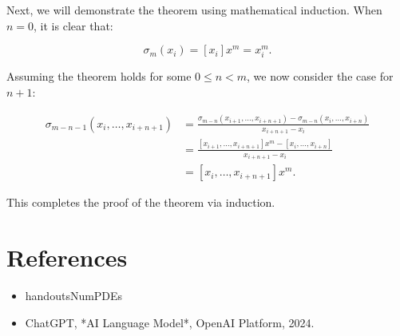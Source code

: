 \documentclass[a4paper]{article}
\begin{document}
Next, we will demonstrate the theorem using mathematical induction. When \( n = 0 \), it is clear that:

\[
\sigma_m(x_i) = [x_i] x^m = x_i^m.
\]

Assuming the theorem holds for some \( 0 \leq n < m \), we now consider the case for \( n + 1 \):

\begin{align*}
    \sigma_{m-n-1}(x_i, \ldots, x_{i+n+1}) & = \frac{\sigma_{m-n}(x_{i+1}, \ldots, x_{i+n+1}) - \sigma_{m-n}(x_i, \ldots, x_{i+n})}{x_{i+n+1} - x_i} \\
    & = \frac{[x_{i+1}, \ldots, x_{i+n+1}] x^m - [x_i, \ldots, x_{i+n}]}{x_{i+n+1} - x_i} \\
    & = [x_i, \ldots, x_{i+n+1}] x^m.
\end{align*}

This completes the proof of the theorem via induction.

\section*{References}
\begin{itemize}
   \item handoutsNumPDEs
   \item ChatGPT, *AI Language Model*, OpenAI Platform, 2024.
\end{itemize}
\end{document}

